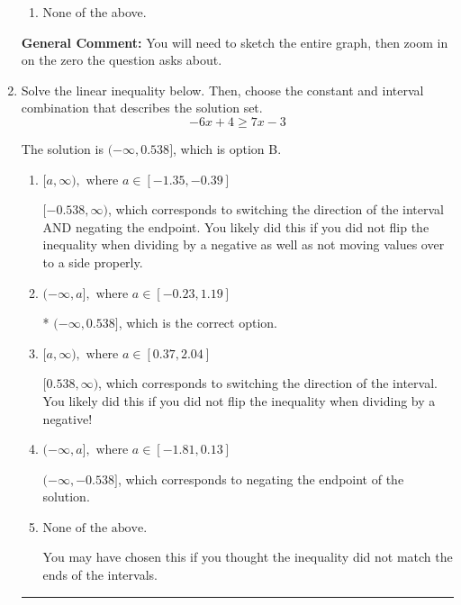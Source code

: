 \documentclass{extbook}[14pt]
\newcommand{\litem}[1]{\item #1

\rule{\textwidth}{0.4pt}}
\begin{document}
\begin{enumerate}
{\begin{enumerate}[label=\Alph*.]
\item None of the above.\end{enumerate}
\textbf{General Comment:} You will need to sketch the entire graph, then zoom in on the zero the question asks about.
}
\litem{
Solve the linear inequality below. Then, choose the constant and interval combination that describes the solution set.
\[ -6x + 4 \geq 7x -3 \]

The solution is \( (-\infty, 0.538] \), which is option B.\begin{enumerate}[label=\Alph*.]
\item \( [a, \infty), \text{ where } a \in [-1.35, -0.39] \)

 $[-0.538, \infty)$, which corresponds to switching the direction of the interval AND negating the endpoint. You likely did this if you did not flip the inequality when dividing by a negative as well as not moving values over to a side properly.
\item \( (-\infty, a], \text{ where } a \in [-0.23, 1.19] \)

* $(-\infty, 0.538]$, which is the correct option.
\item \( [a, \infty), \text{ where } a \in [0.37, 2.04] \)

 $[0.538, \infty)$, which corresponds to switching the direction of the interval. You likely did this if you did not flip the inequality when dividing by a negative!
\item \( (-\infty, a], \text{ where } a \in [-1.81, 0.13] \)

 $(-\infty, -0.538]$, which corresponds to negating the endpoint of the solution.
\item \( \text{None of the above}. \)

You may have chosen this if you thought the inequality did not match the ends of the intervals.
\end{enumerate}

}
\end{enumerate}
\end{document}
